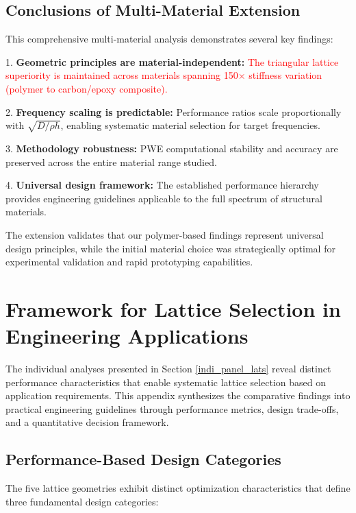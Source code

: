 \documentclass[review,numbers,sort&compress]{elsarticle}
\begin{document}
\subsection{Conclusions of Multi-Material Extension}

This comprehensive multi-material analysis demonstrates several key findings:

1. \textbf{Geometric principles are material-independent:} \textcolor{red}{The triangular lattice superiority is maintained across materials spanning 150× stiffness variation (polymer to carbon/epoxy composite).}

2. \textbf{Frequency scaling is predictable:} Performance ratios scale proportionally with $\sqrt{D/\rho h}$, enabling systematic material selection for target frequencies.

3. \textbf{Methodology robustness:} PWE computational stability and accuracy are preserved across the entire material range studied.

4. \textbf{Universal design framework:} The established performance hierarchy provides engineering guidelines applicable to the full spectrum of structural materials.

The extension validates that our polymer-based findings represent universal design principles, while the initial material choice was strategically optimal for experimental validation and rapid prototyping capabilities.

\newpage
\section{Framework for Lattice Selection in Engineering Applications}\label{selection_framework_appendix}

The individual analyses presented in Section \ref{indi_panel_lats} reveal distinct performance characteristics that enable systematic lattice selection based on application requirements. This appendix synthesizes the comparative findings into practical engineering guidelines through performance metrics, design trade-offs, and a quantitative decision framework.

\subsection{Performance-Based Design Categories}

The five lattice geometries exhibit distinct optimization characteristics that define three fundamental design categories:
\end{document}
